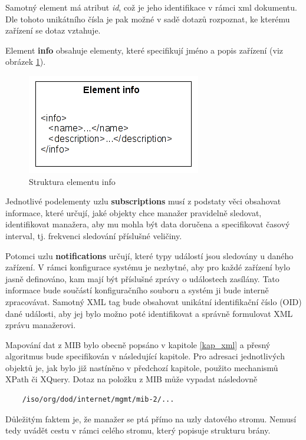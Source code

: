Samotný element má atribut \textit{id}, což je jeho identifikace v rámci xml dokumentu. Dle tohoto unikátního čísla je pak možné
v sadě dotazů rozpoznat, ke kterému zařízení se dotaz vztahuje.

Element \textbf{info} obsahuje elementy, které specifikují jméno a popis zařízení (viz obrázek \ref{obr_an_info_element}).

\begin{figure}[htp]
	\begin{center}
		\includegraphics{obrazky/04_element_info.png}
		\caption{Struktura elementu info}
		\label{obr_an_info_element}
	\end{center}
\end{figure}

Jednotlivé podelementy uzlu \textbf{subscriptions} musí z podstaty věci obsahovat informace, které určují, jaké objekty chce manažer pravidelně sledovat, identifikovat
manažera, aby mu mohla být data doručena a specifikovat časový interval, tj. frekvenci sledování příslušné veličiny.

Potomci uzlu \textbf{notifications} určují, které typy událostí jsou sledovány u daného zařízení. V rámci konfigurace systému je nezbytné, aby pro každé zařízení
bylo jasně definováno, kam mají být příslušné zprávy o událostech zasílány. Tato informace bude součástí konfiguračního souboru a systém ji bude
interně zpracovávat. Samotný XML tag bude obsahovat unikátní identifikační číslo (OID) dané události, aby jej bylo možno poté identifikovat a správně formulovat
XML zprávu manažerovi.

Mapování dat z MIB bylo obecně popsáno v kapitole \ref{kap_xml} a přesný algoritmus bude specifikován v následující kapitole. Pro adresaci jednotlivých objektů
je, jak bylo již nastíněno v předchozí kapitole, použito mechanismů XPath či XQuery. Dotaz na položku z MIB může vypadat následovně
\begin{verbatim}
	/iso/org/dod/internet/mgmt/mib-2/...
\end{verbatim}

Důležitým faktem je, že manažer se ptá přímo na uzly datového stromu. Nemusí tedy uvádět cestu v rámci celého stromu, který popisuje strukturu brány.

